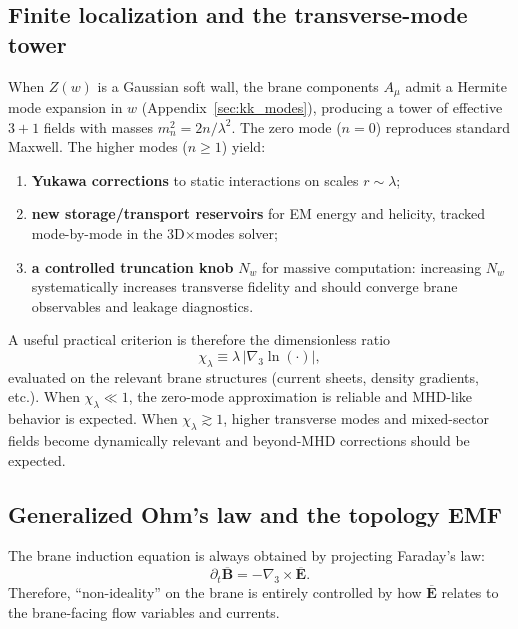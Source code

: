 \documentclass[11pt]{article}
\begin{document}
\subsection{Finite localization and the transverse-mode tower}
\label{sec:finite_localization_beyond}

When \(Z(w)\) is a Gaussian soft wall, the brane components \(A_\mu\) admit a Hermite mode
expansion in \(w\) (Appendix~\ref{sec:kk_modes}), producing a tower of effective \(3+1\)
fields with masses \(m_n^2=2n/\lambda^2\). The zero mode (\(n=0\)) reproduces standard
Maxwell. The higher modes (\(n\ge 1\)) yield:
\begin{enumerate}[leftmargin=1.6em]
\item \textbf{Yukawa corrections} to static interactions on scales \(r\sim\lambda\);
\item \textbf{new storage/transport reservoirs} for EM energy and helicity, tracked mode-by-mode
in the 3D\(\times\)modes solver;
\item \textbf{a controlled truncation knob} \(N_w\) for massive computation: increasing \(N_w\)
systematically increases transverse fidelity and should converge brane observables and leakage
diagnostics.
\end{enumerate}

A useful practical criterion is therefore the dimensionless ratio
\begin{equation}
\chi_\lambda \equiv \lambda\,|\nabla_3 \ln(\cdot)|,
\label{eq:chi_lambda_def}
\end{equation}
evaluated on the relevant brane structures (current sheets, density gradients, etc.).
When \(\chi_\lambda\ll 1\), the zero-mode approximation is reliable and MHD-like behavior is
expected. When \(\chi_\lambda\gtrsim 1\), higher transverse modes and mixed-sector fields
become dynamically relevant and beyond-MHD corrections should be expected.

\subsection{Generalized Ohm's law and the topology EMF}
\label{sec:generalized_ohm_4d}

The brane induction equation is always obtained by projecting Faraday's law:
\begin{equation}
\partial_t \overline{\mathbf{B}} = -\nabla_3\times \overline{\mathbf{E}}.
\label{eq:proj_faraday_beyond}
\end{equation}
Therefore, ``non-ideality'' on the brane is entirely controlled by how \(\overline{\mathbf{E}}\)
relates to the brane-facing flow variables and currents.
\end{document}
